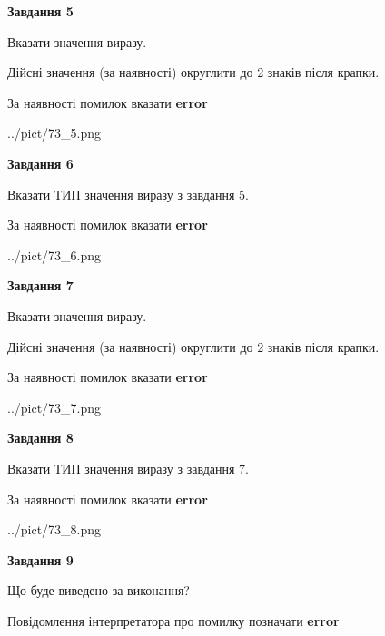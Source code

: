 \documentclass[11pt, ukrainian]{article}
\begin{document}
{\begin {large}
{\begin {center}\textbf{Завдання 5}\end {center}}\par
Вказати значення виразу. \par
Дійсні значення (за наявності) округлити до 2 знаків після крапки. \par
За наявності помилок вказати \textbf{error}

\begin{center}
	{../pict/73_5.png}
\end{center}
\newpage

{\begin {center}\textbf{Завдання 6}\end {center}}\par
Вказати ТИП значення виразу з завдання 5. \par
За наявності помилок вказати \textbf{error}

\begin{center}
	{../pict/73_6.png}
\end{center}
\newpage

{\begin {center}\textbf{Завдання 7}\end {center}}\par
Вказати значення виразу. \par
Дійсні значення (за наявності) округлити до 2 знаків після крапки. \par
За наявності помилок вказати \textbf{error}

\begin{center}
	{../pict/73_7.png}
\end{center}
\newpage

{\begin {center}\textbf{Завдання 8}\end {center}}\par
Вказати ТИП значення виразу з завдання 7. \par
За наявності помилок вказати \textbf{error}

\begin{center}
	{../pict/73_8.png}
\end{center}
\newpage

{\begin {center}\textbf{Завдання 9}\end {center}}\par
Що буде виведено за виконання? \par
Повідомлення інтерпретатора про помилку позначати \textbf{error}


\end{large}}
\end{document}
